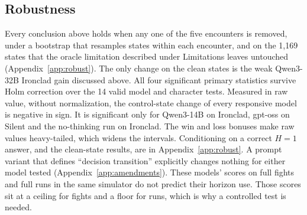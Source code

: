 \begin{table}[t]
\centering
\footnotesize
\setlength{\tabcolsep}{1.2pt}
\caption{Knowledge and familiarity contrasts: change in the primary statistic between conditions, paired by state, 95\% intervals. None rejects after Holm correction over all eight. $^{\equiv}$Equivalent to zero within $\pm.10$ (90\% interval). $^\dagger$Descriptive (gate failed).}
\label{tab:knowledge}
\end{table}

\subsection{Robustness}

Every conclusion above holds when any one of the five encounters is removed, under a bootstrap that resamples states within each encounter, and on the 1,169 states that the oracle limitation described under Limitations leaves untouched (Appendix~\ref{app:robust}). The only change on the clean states is the weak Qwen3-32B Ironclad gain discussed above. All four significant primary statistics survive Holm correction over the 14 valid model and character tests. Measured in raw value, without normalization, the control-state change of every responsive model is negative in sign. It is significant only for Qwen3-14B on Ironclad, gpt-oss on Silent and the no-thinking run on Ironclad. The win and loss bonuses make raw values heavy-tailed, which widens the intervals. Conditioning on a correct $H{=}1$ answer, and the clean-state results, are in Appendix~\ref{app:robust}. A prompt variant that defines ``decision transition'' explicitly changes nothing for either model tested (Appendix~\ref{app:amendments}). These models' scores on full fights and full runs in the same simulator do not predict their horizon use. Those scores sit at a ceiling for fights and a floor for runs, which is why a controlled test is needed.
